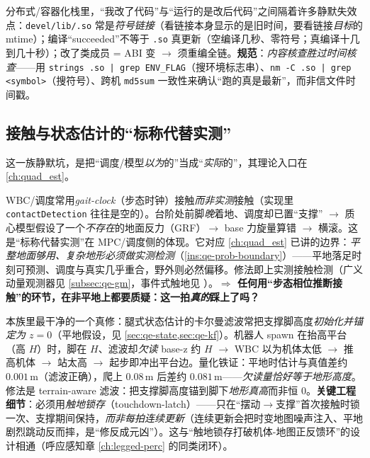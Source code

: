 \begin{insight}\label{ins:ld-stale-binary}
分布式/容器化栈里，“我改了代码”与“运行的是改后代码”之间隔着许多静默失效点：\texttt{devel/\allowbreak lib/\allowbreak *.\allowbreak so} 常是\emph{符号链接}（看链接本身显示的是旧时间，要看链接\emph{目标}的 mtime）；编译“succeeded”不等于 \texttt{.so} 真更新（空编译几秒、零符号；真编译十几到几十秒）；改了类成员 = ABI 变 $\to$ 须重编全链。\textbf{规范}：\emph{内容核查胜过时间核查}——用 \texttt{strings .\allowbreak so | grep ENV\_FLAG}（搜环境标志串）、\texttt{nm -C .\allowbreak so | grep <symbol>}（搜符号）、跨机 \texttt{md5sum} 一致性来确认“跑的真是最新”，而非信文件时间戳。
\end{insight}

\subsection{接触与状态估计的“标称代替实测”}
\label{subsec:ld-silent-contact}

这一族静默坑，是把“调度/模型\emph{以为}的”当成“\emph{实际}的”，其理论入口在 \cref{ch:quad_est}。

\begin{insight}\label{ins:ld-gaitclock}
WBC/调度常用\emph{gait-clock}（步态时钟）接触\emph{而非实测}接触（实现里 \texttt{contactDetection} 往往是空的）。台阶处前脚\emph{晚}着地、调度却已置“支撑” $\to$ 质心模型假设了一个\emph{不存在}的地面反力（GRF）$\to$ base 力旋量算错 $\to$ 横滚。这是“标称代替实测”在 MPC/调度侧的体现。它对应 \cref{ch:quad_est} 已讲的边界：\emph{平整地面够用、复杂地形必须做实测检测}（\cref{ins:qe-prob-boundary}）——平地落足时刻可预测、调度与真实几乎重合，野外则必然偏移。修法即上实测接触检测（广义动量观测器见 \cref{subsec:qe-gm}，事件式触地见 \cite{bledt2018contact}）。\textbf{$\Rightarrow$ 任何用“步态相位推断接触”的环节，在非平地上都要质疑：这一拍\emph{真的}踩上了吗？}
\end{insight}

\begin{insight}\label{ins:ld-kf-terrain}
本族里最干净的一个真修：腿式状态估计的卡尔曼滤波常把支撑脚高度\emph{初始化并锚定为 $z=0$}（平地假设，见 \cref{sec:qe-state,sec:qe-kf}）。机器人 spawn 在抬高平台（高 $H$）时，脚在 $H$、滤波却\emph{欠读} base-z 约 $H$ $\to$ WBC 以为机体太低 $\to$ 推高机体 $\to$ 站太高 $\to$ 起步即冲出平台边。量化铁证：平地时估计与真值差约 $0.001\,\mathrm{m}$（滤波正确），爬上 $0.08\,\mathrm{m}$ 后差约 $0.081\,\mathrm{m}$——\emph{欠读量恰好等于地形高度}。修法是 terrain-aware 滤波：把支撑脚高度锚到脚下\emph{地形真高}而非恒 $0$。\textbf{关键工程细节}：必须用\emph{触地锁存}（touchdown-latch）——只在“摆动$\to$支撑”首次接触时锁一次、支撑期间保持，\emph{而非每拍连续更新}（连续更新会把时变地图噪声注入、平地剧烈跳动反而摔，是“修反成元凶”）。这与“触地锁存打破机体-地图正反馈环”的设计相通（呼应感知章 \cref{ch:legged-perc} 的同类闭环）。
\end{insight}

